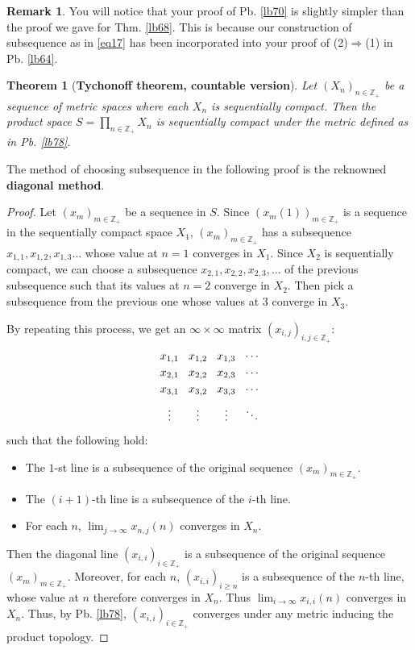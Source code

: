 \documentclass[12pt,b5paper,notitlepage]{article}
\theoremstyle{definition}
\newtheorem{rem}[df]{Remark}
\theoremstyle{plain}
\newtheorem{thm}[df]{Theorem}
\newcommand{\Zbb}{\mathbb Z}
\newcommand{\dps}{\displaystyle}
\numberwithin{equation}{section}
\begin{document}
\begin{rem}
You will notice that your proof of Pb. \ref{lb70} is slightly simpler than the proof we gave for Thm. \ref{lb68}. This is because our construction of subsequence as in \eqref{eq17} has been incorporated into your proof of (2)$\Rightarrow$(1) in Pb. \ref{lb64}.
\end{rem}

\begin{thm}[\textbf{Tychonoff theorem, countable version}]  \label{lb89}
Let $(X_n)_{n\in\Zbb_+}$ be a sequence of metric spaces where each $X_n$ is sequentially compact. Then the product space $\dps S=\prod_{n\in\Zbb_+} X_n$ is sequentially compact under the metric defined  as in Pb. \ref{lb78}.
\end{thm}

The method of choosing subsequence in the following proof is the reknowned \textbf{diagonal method}. 

\begin{proof}
Let $(x_m)_{m\in\Zbb_+}$ be a sequence in $S$. Since $(x_m(1))_{m\in\Zbb_+}$ is a sequence in the sequentially compact space $X_1$, $(x_m)_{m\in\Zbb_+}$ has a subsequence $x_{1,1},x_{1,2},x_{1,3}\dots$ whose value at $n=1$ converges in $X_1$. Since $X_2$ is sequentially compact, we can choose a subsequence $x_{2,1},x_{2,2},x_{2,3},\dots$ of the previous subsequence such that its values at $n=2$ converge in $X_2$. Then pick a subsequence from the previous one whose values at $3$ converge in $X_3$. 

By repeating this process, we get an $\infty\times\infty$ matrix $(x_{i,j})_{i,j\in\Zbb_+}$:
\begin{equation}
\begin{tikzcd}[sep=0cm]
{x_{1,1}} & {x_{1,2}} & {x_{1,3}} & \cdots \\
{x_{2,1}} & {x_{2,2}} & {x_{2,3}} & \cdots \\
{x_{3,1}} & {x_{3,2}} & {x_{3,3}} & \cdots \\
\vdots    & \vdots    & \vdots    & \ddots
\end{tikzcd}
\end{equation}
such that the following hold:
\begin{itemize}
\item The $1$-st line is a subsequence of the original sequence $(x_m)_{m\in\Zbb_+}$.
\item The $(i+1)$-th line is a subsequence of the $i$-th line.
\item For each $n$, $\lim_{j\rightarrow\infty} x_{n,j}(n)$ converges in $X_n$.
\end{itemize}
Then the diagonal line $(x_{i,i})_{i\in\Zbb_+}$ is a subsequence of the original sequence $(x_m)_{m\in\Zbb_+}$. Moreover, for each $n$, $(x_{i,i})_{i\geq n}$ is a subsequence of the $n$-th line, whose value at $n$ therefore converges in $X_n$. Thus $\lim_{i\rightarrow\infty} x_{i,i}(n)$ converges in $X_n$. Thus, by Pb. \ref{lb78}, $(x_{i,i})_{i\in\Zbb_+}$ converges under any metric inducing the product topology.
\end{proof}
\end{document}
